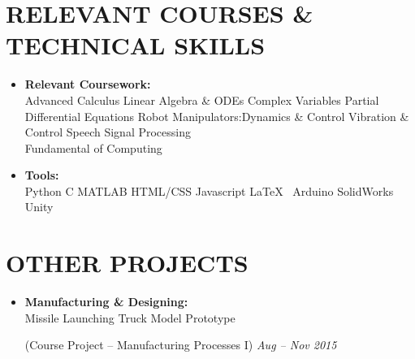\documentclass[11pt,a4paper,roman]{moderncv}        %
\begin{document}
{{{{{{{{\section{RELEVANT COURSES \& TECHNICAL SKILLS}
\begin{minipage}{1.15\maincolumnwidth}%
	\small{
    	\begin{itemize}
          \item \textbf{Relevant Coursework:}\\   \textbullet{}Advanced Calculus\hspace{0.4cm}  \textbullet{}Linear Algebra \& ODEs\hspace{0.4cm}  \textbullet{}Complex Variables\hspace{0.4cm} \textbullet{}Partial Differential Equations \hspace{0.8cm}\textbullet{}Robot Manipulators:Dynamics \& Control\hspace{1cm} \textbullet{}Vibration \& Control\hspace{1cm} \textbullet{}Speech Signal Processing \\ \textbullet{}Fundamental of Computing 
          \item \textbf{Tools:}\\ \textbullet{}Python\hspace{0.3cm} 
          \textbullet{}C\hspace{0.3cm} \textbullet{}MATLAB\hspace{0.3cm} \textbullet{}HTML/CSS\hspace{0.3cm} \textbullet{}Javascript\hspace{0.3cm} \textbullet{}\LaTeX\ \hspace{0.3cm}
          \textbullet{}Arduino\hspace{0.3cm}
          \textbullet{}SolidWorks\hspace{0.3cm}
          \textbullet{}Unity
		\end{itemize}}%
\end{minipage}%


\section{OTHER PROJECTS}
\begin{minipage}{1.16\maincolumnwidth}%
	\small{
    	\begin{itemize}
          \item \textbf{Manufacturing \& Designing:} \\    \textbullet{}Missile Launching Truck Model Prototype \begin{footnotesize}(Course Project – Manufacturing Processes I)  \hspace{1.8cm}  \textit{Aug – Nov 2015}\end{footnotesize}
          

\end{itemize}}
\end{minipage}}}}}}}}}
\end{document}
